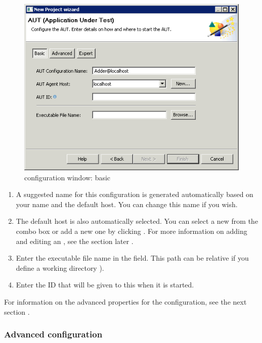 \begin{figure}[h]
\begin{center}
\includegraphics{Tasks/AUTs/PS/autconfigwindow_basic}
\caption{\gdaut configuration window: basic}
\label{autconfigbasic}
\end{center}
\end{figure}

\begin{enumerate}
\item A suggested name for this \gdaut{} configuration is generated automatically based on your \gdaut{} name and the default \gdagent{} host. You can change this name if you wish. 
\item The default \gdagent host is also automatically selected. You can select a new \gdagent{} from the combo box or add a new one by clicking . For more information on adding and editing an \gdagent{}, see the section later .

\item Enter the executable file name in the  field. This path can be relative if you define a working directory ).
\item Enter the \gdaut{} ID that will be given to this \gdaut{} when it is started.  
\end{enumerate}
For information on the advanced properties for the \gdaut{} configuration, see the next section . 


\subsubsection{Advanced \gdaut{} configuration}
\label{AdvancedAUTConfig}


